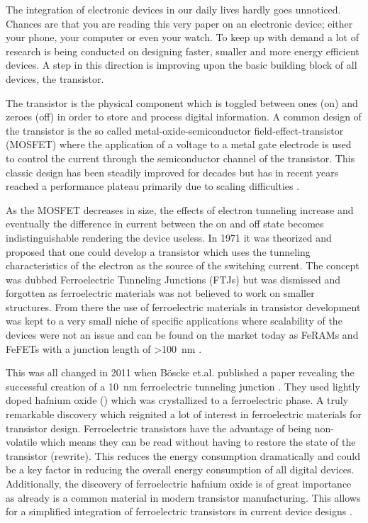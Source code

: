 \documentclass[11pt,twoside,final]{eitExjobb}  %
\begin{document}
The integration of electronic devices in our daily lives hardly goes unnoticed.
Chances are that you are reading this very paper on an electronic device;
either your phone, your computer or even your watch. To keep up with demand a
lot of research is being conducted on designing faster, smaller and more energy
efficient devices. A step in this direction is improving upon the basic
building block of all devices, the transistor.

The transistor is the physical component which is toggled between ones (on) and
zeroes (off) in order to store and process digital information. A common design
of the transistor is the so called metal-oxide-semiconductor
field-effect-transistor (MOSFET) where the application of a voltage to a metal gate
electrode is used to control the current through the semiconductor channel of the
transistor. This classic design has been steadily improved for decades but has
in recent years reached a performance plateau primarily due to scaling
difficulties \cite{ratnech2021advancement}.

As the MOSFET decreases in size, the effects of electron tunneling increase and
eventually the difference in current between the on and off state becomes
indistinguishable rendering the device useless. In 1971 it was theorized and
proposed that one could develop a transistor which uses the tunneling
characteristics of the electron as the source of the switching current. The
concept was dubbed Ferroelectric Tunneling Junctions (FTJs) but was dismissed
and forgotten as ferroelectric materials was not believed to work on smaller
structures. From there the use of ferroelectric materials in transistor
development was kept to a very small niche of specific applications where
scalability of the devices were not an issue and can be found on the market
today as FeRAMs and FeFETs with a junction length of >\SI{100}{\nano\meter}
\cite{garcia2014ferroelectric, mikolajick2020past}.

This was all changed in 2011 when Böscke et.al. published a paper revealing the
successful creation of a \SI{10}{\nano\meter} ferroelectric tunneling junction
\cite{boscke2011ferroelectricity}. They used lightly doped hafnium oxide
() which was crystallized to a ferroelectric phase. A truly remarkable
discovery which reignited a lot of interest in ferroelectric materials for
transistor design. Ferroelectric transistors have the advantage of being
non-volatile which means they can be read without having to restore the state
of the transistor (rewrite). This reduces the energy consumption dramatically
and could be a key factor in reducing the overall energy consumption of all
digital devices. Additionally, the discovery of ferroelectric hafnium oxide is
of great importance as  already is a common material in modern transistor
manufacturing. This allows for a simplified integration of ferroelectric
transistors in current device designs \cite{mikolajick2020past}.
\end{document}
